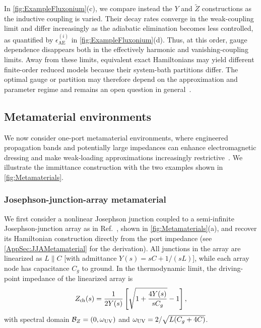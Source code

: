 \documentclass[prx,aps,twocolumn,article]{revtex4-2}
\begin{document}
In \cref{fig:ExampleFluxonium}(c), we compare instead the $Y$ and $\tilde Z$ constructions as the inductive coupling is varied. Their decay rates converge in the weak-coupling limit and differ increasingly as the
adiabatic elimination becomes less controlled, as quantified by $\epsilon_{\mathrm{AE}}^{(i)}$ in \cref{fig:ExampleFluxonium}(d). Thus, at this order, gauge dependence disappears both in the effectively
harmonic and vanishing-coupling limits. Away from these limits, equivalent exact Hamiltonians may yield different finite-order reduced models because
their system-bath partitions differ. The optimal gauge or partition may therefore depend on the approximation and parameter regime and remains an
open question in general~\cite{Manucharyan:2017,DeBernardis:2018,
Roth:2019,Mehta:2022,Arwas:2023}.

\subsection{Metamaterial environments}
\label{Sec:MetamaterialExamples}

We now consider one-port metamaterial environments, where engineered
propagation bands and potentially large impedances can enhance
electromagnetic dressing and make weak-loading approximations increasingly
restrictive~\cite{Zueco:2012,Egger:2013,PuertasMartinez:2019,
Leger:2019,Indrajeet:2020}. We illustrate the immittance construction with
the two examples shown in \cref{fig:Metamaterials}.

\subsubsection{Josephson-junction-array metamaterial}
\label{Sec:JJAMetamaterial}

We first consider a nonlinear Josephson junction coupled to a semi-infinite Josephson-junction array as in Ref.~\cite{Snyman:2015}, shown in \cref{fig:Metamaterials}(a), and recover its Hamiltonian construction directly from the port impedance
(see \cref{AppSec:JJAMetamaterial} for the derivation). All junctions in the array are linearized as $L\parallel C$ [with admittance $Y(s)=sC+1/(sL)$], while each array node has capacitance $C_g$ to ground. In the thermodynamic limit, the driving-point impedance of the linearized array is
\begin{align}
Z_{\rm ch}(s)
=
\frac{1}{2Y(s)}
\left[
\sqrt{1+\frac{4Y(s)}{sC_g}}-1
\right],
\label{Eq:JJAChainImpedance}
\end{align}
with spectral domain $\mathcal B_Z=(0,\omega_{\rm UV})$ and
$\omega_{\rm UV}=2/\sqrt{L(C_g+4C)}$.
\end{document}
